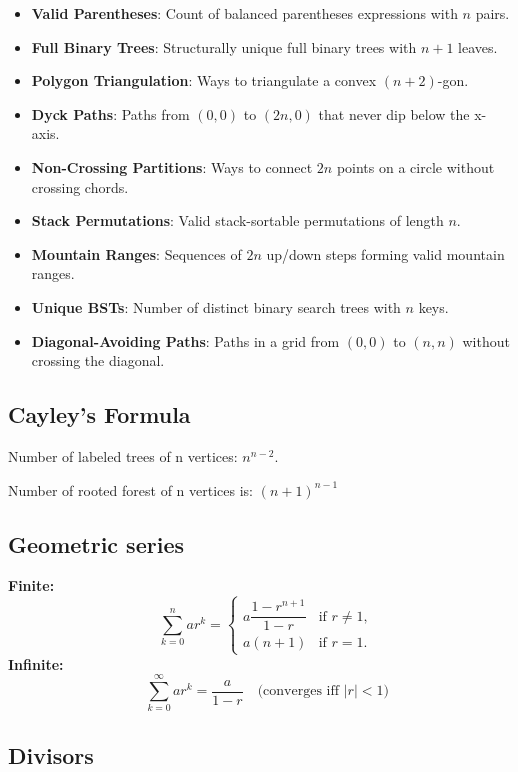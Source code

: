 \documentclass[10pt]{article}
\begin{document}
\begin{multicols*}{2}
\begin{itemize}
    \item \textbf{Valid Parentheses}: Count of balanced parentheses expressions with \( n \) pairs.
    \item \textbf{Full Binary Trees}: Structurally unique full binary trees with \( n+1 \) leaves.
    \item \textbf{Polygon Triangulation}: Ways to triangulate a convex \( (n+2) \)-gon.
    \item \textbf{Dyck Paths}: Paths from \( (0,0) \) to \( (2n,0) \) that never dip below the x-axis.
    \item \textbf{Non-Crossing Partitions}: Ways to connect \( 2n \) points on a circle without crossing chords.
    \item \textbf{Stack Permutations}: Valid stack-sortable permutations of length \( n \).
    \item \textbf{Mountain Ranges}: Sequences of \( 2n \) up/down steps forming valid mountain ranges.
    \item \textbf{Unique BSTs}: Number of distinct binary search trees with \( n \) keys.
    \item \textbf{Diagonal-Avoiding Paths}: Paths in a grid from \( (0,0) \) to \( (n,n) \) without crossing the diagonal.
\end{itemize}

\subsection{Cayley's Formula}

Number of labeled trees of n vertices: $n^{n-2}$.

Number of rooted forest of n vertices is: $(n+1)^{n-1}$

\subsection{Geometric series}

\textbf{Finite:} \[\quad \sum_{k=0}^{n} ar^k = 
\begin{cases} 
a \dfrac{1 - r^{n+1}}{1 - r} & \text{if } r \neq 1, \\
a(n + 1) & \text{if } r = 1.
\end{cases}
\]
\textbf{Infinite:} \[\quad \sum_{k=0}^{\infty} ar^k = \frac{a}{1 - r} \quad \text{(converges iff } |r| < 1\text{)}
\]
\subsection{Divisors}


\end{multicols*}
\end{document}
